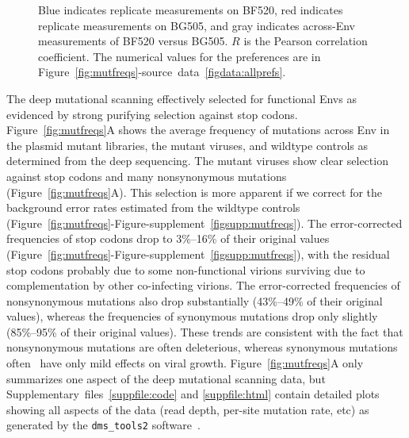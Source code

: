 \documentclass[9pt]{elife}
\begin{document}
\begin{figure}
{Blue indicates replicate measurements on BF520, red indicates replicate measurements on BG505, and gray indicates across-Env measurements of BF520 versus BG505.
$R$ is the Pearson correlation coefficient. 
The numerical values for the preferences are in Figure~\ref{fig:mutfreqs}-source~data~\ref{figdata:allprefs}.
}
{}
\end{figure}

The deep mutational scanning effectively selected for functional Envs as evidenced by strong purifying selection against stop codons.
Figure~\ref{fig:mutfreqs}A shows the average frequency of mutations across Env in the plasmid mutant libraries, the mutant viruses, and wildtype controls as determined from the deep sequencing.
The mutant viruses show clear selection against stop codons and many nonsynonymous mutations (Figure~\ref{fig:mutfreqs}A).
This selection is more apparent if we correct for the background error rates estimated from the wildtype controls (Figure~\ref{fig:mutfreqs}-Figure-supplement~\ref{figsupp:mutfreqs}).
The error-corrected frequencies of stop codons drop to 3\%--16\% of their original values (Figure~\ref{fig:mutfreqs}-Figure-supplement~\ref{figsupp:mutfreqs}), with the residual stop codons probably due to some non-functional virions surviving due to complementation by other co-infecting virions. 
The error-corrected frequencies of nonsynonymous mutations also drop substantially (43\%--49\% of their original values), whereas the frequencies of synonymous mutations drop only slightly (85\%--95\% of their original values).
These trends are consistent with the fact that nonsynonymous mutations are often deleterious, whereas synonymous mutations often~\citep[although certainly not always, see][]{zanini2013quantifying} have only mild effects on viral growth.
Figure~\ref{fig:mutfreqs}A only summarizes one aspect of the deep mutational scanning data, but Supplementary~files~\ref{suppfile:code} and \ref{suppfile:html} contain detailed plots showing all aspects of the data (read depth, per-site mutation rate, etc) as generated by the \texttt{dms\_tools2} software~\citep[\url{https://jbloomlab.github.io/dms_tools2/}]{bloom2015software}.
\end{document}
